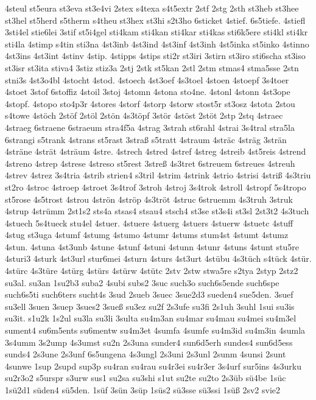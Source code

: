 {4steul
st5eura
st3eva
st3e4vi
2stex
s4texa
s4t5extr
2stf
2stg
2sth
st3heb
st3hee
st3hel
st5herd
s5therm
s4theu
st3hex
st3hi
s2t3ho
6sticket
4stief.
6s5tiefe.
4stiefl
3sti4el
stie6lei
3stif
st5i4gel
sti4kam
sti4kan
sti4kar
sti4kas
sti6k5ere
sti4kl
sti4kr
sti4la
4stimp
s4tin
sti3na
4st3inb
4st3ind
4st3inf
4st3inh
4st5inka
st5inko
4stinno
4st3ins
4st3int
4stinv
4stip.
4stipps
4stips
sti2r
st3iri
3stirn
st3iro
sti6scha
st3iso
st3isr
st3ita
stiva4
3stiz
stiz3a
2stj
2stk
st5kan
2stl
2stm
stmas4
stma5sse
2stn
stni3s
4st3o4bl
4stocht
4stod.
4stoech
4st3oef
4s3toel
4stoen
4stoepf
3s4toer
4stoet
3stof
6stoffiz
4stoil
3stoj
4stomn
4stona
sto4ne.
4stonl
4stonn
4st3ope
4stopf.
4stopo
sto4p3r
4stores
4storf
4storp
4storw
stost5r
st3osz
4stota
2stou
s4towe
4stöch
2stöf
2stöl
2stön
4s3töpf
3stör
4stöst
2stöt
2stp
2stq
4straec
4straeg
6straene
6straeum
stra4f5a
4strag
3strah
st6rahl
4strai
3s4tral
stra5la
6strangi
s5trank
4strans
st5rast
3straß
s5tratt
4straum
4sträc
4sträg
3strän
4sträne
4strät
4sträum
4stre.
4strech
4stred
4stref
4streg
4streib
4st5reis
4strend
4streno
4strep
4strese
4streso
st5rest
3streß
4s3tret
6streuem
6streues
4streuh
4strev
4strez
3s4tria
4strib
strien4
s3tril
4strim
4strink
4strio
4strisi
4striß
4s3triu
st2ro
4stroc
4stroep
4stroet
3s4trof
3stroh
4stroj
3s4trok
4stroll
4stropf
5s4tropo
st5rose
4s5trost
4strou
4strön
4ströp
4s3tröt
4struc
6struemm
4s3truh
3struk
4strup
4strümm
2st1s2
sts4a
stsas4
stsau4
stsch4
st3se
st3s4i
st3sl
2st3t2
4s3tuch
4stuech
5s4tueck
stu4el
4stuer.
4stuere
4stuerg
4stuers
4stuerw
4stuetc
4stuff
4stug
st3uga
4stumf
4stumg
4stumo
4stumr
4stums
stum4st
4stumt
4stumz
4stun.
4stuna
4st3unb
4stune
4stunf
4stuni
4stunn
4stunr
4stuns
4stunt
stu5re
4sturi3
4sturk
4st3url
stur6mei
4sturn
4sturs
4st3urt
4stübu
4s3tüch
s4tück
4stür.
4stürc
4s3türe
4stürg
4stürs
4stürw
4stütc
2stv
2stw
stwa5re
s2tya
2styp
2stz2
su3al.
su3an
1su2b3
suba2
4subi
subs2
3suc
such3o
such6s5ende
such6spe
such6s5ti
such6ters
sucht4s
3sud
2sueb
3suec
3sue2d3
sueden4
sue5den.
3suef
su3ell
3suen
3suep
3sues2
3sueß
su3ez
su2f
2s3ufe
su3fi
2s1uh
3suhl
1sui
su3is
su3it.
s1u2k
1s2ul
su3la
su3li
3sulta
su4m3an
su4mar
su4mau
su4mei
su4m3el
sument4
su6m5ents
su6mentw
su4m3et
4sumfa
4sumfe
su4m3id
su4m3in
4sumla
3s4umm
3s2ump
4s3umst
su2n
2s3una
sunder4
sun6d5erh
sundes4
sun6d5ess
sunds4
2s3une
2s3unf
6s5ungena
4s3ungl
2s3uni
2s3unl
2sunm
4sunsi
2sunt
4sunwe
1sup
2supd
sup3p
su4ran
su4rau
su4r3ei
su4r3er
3s4urf
sur5ins
4s3urku
su2r3o2
s5urspr
s3urw
sus1
su2sa
su3shi
s1ut
su2te
su2to
2s3üb
sü4be
1süc
1sü2d1
süden4
sü5den.
1süf
3sün
3süp
1süs2
sü3sse
sü3ssi
1süß
2sv2
svie2
}
